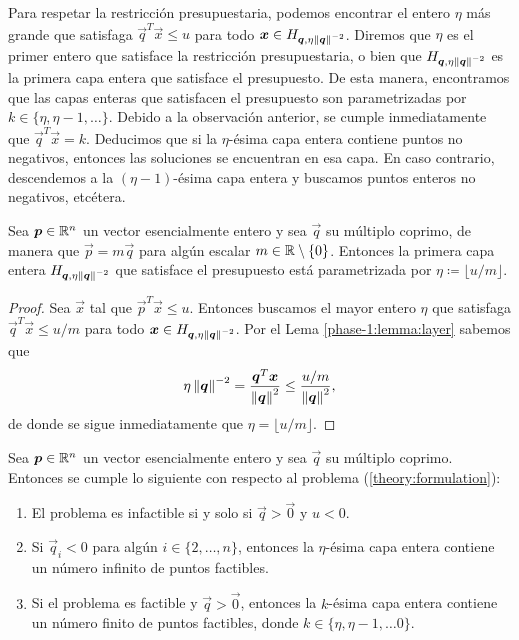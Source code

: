 Para respetar la restricción presupuestaria, podemos encontrar el entero $\eta$ más grande que
satisfaga $\vec{q}^T\vec{x} \leq u$ para todo $\boldsymbol{x} \in H_{\boldsymbol{q}, \eta\left\lVert \boldsymbol{q} \right\rVert^{-2}}$.
Diremos que $\eta$ es el primer entero que satisface la restricción presupuestaria, o bien que
$H_{\boldsymbol{q}, \eta\left\lVert \boldsymbol{q} \right\rVert^{-2}}$ es la primera capa entera que satisface el presupuesto. De
esta manera, encontramos que las capas enteras que satisfacen el presupuesto son parametrizadas por
$k \in \lbrace \eta, \eta - 1, \ldots \rbrace$. Debido a la observación anterior, se cumple
inmediatamente que $\vec{q}^T\vec{x} = k$. Deducimos que si la $\eta$-ésima capa entera contiene
puntos no negativos, entonces las soluciones se encuentran en esa capa. En caso contrario,
descendemos a la $(\eta - 1)$-ésima capa entera y buscamos puntos enteros no negativos, etcétera.
\begin{lemma}
	\label{phase-1:lemma:eta}
	Sea $\boldsymbol{p} \in \mathbb{R}^n$ un vector esencialmente entero y sea $\vec{q}$ su múltiplo coprimo, de
	manera que $\vec{p} = m\vec{q}$ para algún escalar $m \in \mathbb{R} \setminus \lbrace 0 \rbrace$.
	Entonces la primera capa entera $H_{\boldsymbol{q}, \eta \left\lVert \boldsymbol{q} \right\rVert^{-2}}$ que satisface el
	presupuesto está parametrizada por $\eta \coloneq \lfloor u/m \rfloor$.
\end{lemma}
\begin{proof}
	Sea $\vec{x}$ tal que $\vec{p}^T\vec{x} \leq u$. Entonces buscamos el mayor entero $\eta$ que
	satisfaga $\vec{q}^T\vec{x} \leq u/m$ para todo $\boldsymbol{x} \in H_{\boldsymbol{q},
	\eta\left\lVert \boldsymbol{q} \right\rVert^{-2}}$. Por el Lema \ref{phase-1:lemma:layer} sabemos que
	\begin{equation*}
		\eta\left\lVert \boldsymbol{q} \right\rVert^{-2} = \frac{\boldsymbol{q}^T\boldsymbol{x}}{\left\lVert \boldsymbol{q} \right\rVert^2} \leq
		\frac{u/m}{\left\lVert \boldsymbol{q} \right\rVert^2},
	\end{equation*}
	de donde se sigue inmediatamente que $\eta = \lfloor u/m \rfloor$.
\end{proof}
\begin{theorem}
	\label{theory:th:feasibility}
	Sea $\boldsymbol{p} \in \mathbb{R}^n$ un vector esencialmente entero y sea $\vec{q}$ su múltiplo coprimo.
	Entonces se cumple lo siguiente con respecto al problema (\ref{theory:formulation}):
	\begin{enumerate}
		\item El problema es infactible si y solo si $\vec{q} > \vec{0}$ y $u < 0$.
		\item Si $\vec{q}_i < 0$ para algún $i \in \lbrace 2, \ldots, n
			\rbrace$, entonces la $\eta$-ésima capa entera contiene un número infinito de puntos
			factibles.
		\item Si el problema es factible y $\vec{q} > \vec{0}$, entonces la $k$-ésima capa entera
			contiene un número finito de puntos factibles, donde $k \in \lbrace \eta, \eta - 1,
			\ldots 0 \rbrace$.
	\end{enumerate}
\end{theorem}

